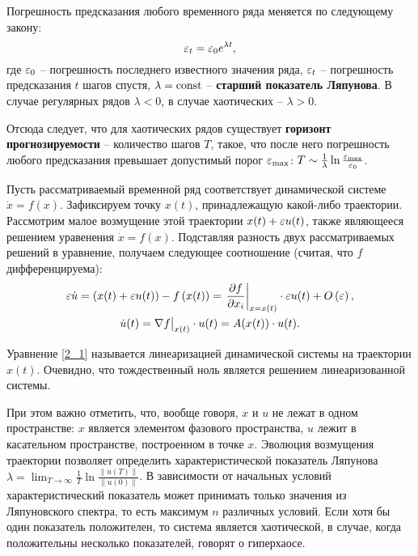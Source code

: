 
Погрешность предсказания любого временного ряда меняется по следующему закону:
\begin{equation*}
    \varepsilon_t = \varepsilon_0 e^{\lambda t},
\end{equation*}
где $\varepsilon_0$ -- погрешность последнего известного значения ряда, $\varepsilon_t$ -- погрешность предсказания $t$ шагов спустя, $\lambda = \mathrm{const}$ -- \textbf{старший показатель Ляпунова}. В случае регулярных рядов $\lambda < 0$, в случае хаотических -- $\lambda > 0$.

Отсюда следует, что для хаотических рядов существует \textbf{горизонт прогнозируемости} -- количество шагов $T$, такое, что после него погрешность любого предсказания превышает допустимый порог $\varepsilon_{\text{max}}$: $T \sim \frac{1}{\lambda} \ln \frac{\varepsilon_{\text{max}}}{\varepsilon_0}$.

Пусть рассматриваемый временной ряд соответствует динамической системе $\dot{x} = f(x)$.
Зафиксируем точку $x(t)$, принадлежащую какой-либо траектории. Рассмотрим малое возмущение этой траектории $x(t) + \varepsilon u(t)$, также являющееся решением уравенения $\dot{x} = f(x)$.
Подставляя разность двух рассматриваемых решений в уравнение, получаем следующее соотношение (считая, что $f$ дифференцируема):
\begin{gather}
\nonumber
    \varepsilon \dot{u} = 
    \left( x(t) + \varepsilon u(t) \right) - f\left( x(t) \right) =
    \left. \frac{\partial f}{\partial x_i} \right|_{x=x(t)} \cdot \varepsilon u(t) + O\left( \varepsilon \right), \\
\label{2_1}
    \dot{u}(t) = \nabla f \big|_{x(t)} \cdot u(t) = A(x(t)) \cdot u(t).
\end{gather}

Уравнение \eqref{2_1} называется линеаризацией динамической системы на траектории $x(t)$.
Очевидно, что тождественный ноль является решением линеаризованной системы.

При этом важно отметить, что, вообще говоря, $x$ и $u$ не лежат в одном пространстве: $x$ является элементом фазового пространства, $u$ лежит в касательном пространстве, построенном в точке $x$.
Эволюция возмущения траектории позволяет определить характеристической показатель Ляпунова $\lambda = \lim_{T \to \infty} \frac{1}{T} \ln \frac{\| u(T) \|}{\| u(0) \|}$.
В зависимости от начальных условий характеристический показатель может принимать только значения из Ляпуновского спектра, то есть максимум $n$ различных условий.
Если хотя бы один показатель положителен, то система является хаотической, в случае, когда положительны несколько показателей, говорят о гиперхаосе.

